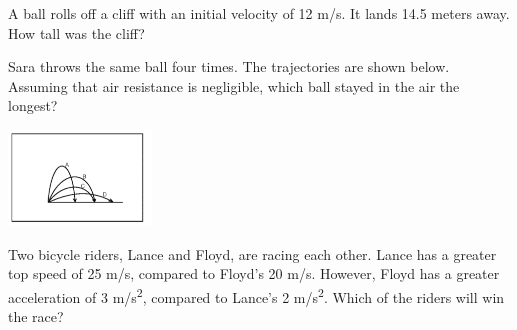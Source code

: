 \documentclass[10pt]{examdesign}
\begin{document}
\begin{multiplechoice} [title={Multiple Choice},
	rearrange=no]
\begin{question}
	A ball rolls off a cliff with an initial velocity of 12 m/s.  It lands 14.5 meters away.  How tall was the cliff?
\end{question}

\begin{question}
Sara throws the same ball four times.  The trajectories are shown below. Assuming that air resistance is negligible, which ball stayed in the air the longest? 

\includegraphics[height={1in}]{proj.png}

\end{question}






\begin{question}
	Two bicycle riders, Lance and Floyd, are racing each other. Lance has a greater top speed of 25 m/s, compared to Floyd's 20 m/s.  However, Floyd has a greater acceleration of 3 m/s\textsuperscript{2}, compared to Lance's 2 m/s\textsuperscript{2}.  Which of the riders will win the race?
\end{question}





\end{multiplechoice}
\end{document}
